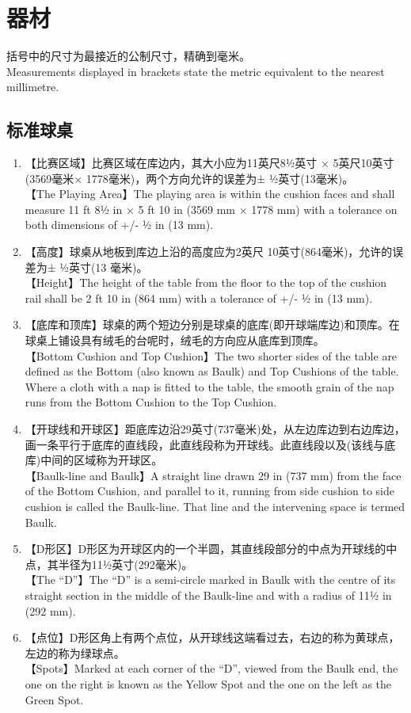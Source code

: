 \section{器材}\label{221}

\noindent 括号中的尺寸为最接近的公制尺寸，精确到毫米。\\
Measurements displayed in brackets state the metric equivalent 
to the nearest millimetre.

\subsection{标准球桌}\label{2211}

\begin{enumerate}[label=(\alph*)]
    \item 【比赛区域】比赛区域在库边内，其大小应为11英尺8½英寸 × 5英尺10英寸(3569毫米× 1778毫米)，两个方向允许的误差为± ½英寸(13毫米)。\\
    【The Playing Area】The playing area is within the cushion faces and shall measure 11 ft 8½ in × 5 ft 10 in (3569 mm × 1778 mm) with a tolerance on both dimensions of +/- ½ in (13 mm).
    \item 【高度】球桌从地板到库边上沿的高度应为2英尺 10英寸(864毫米)，允许的误差为± ½英寸(13 毫米)。\\
    【Height】The height of the table from the floor to the top of the cushion rail shall be 2 ft 10 in (864 mm) with a tolerance of +/- ½ in (13 mm).
    \item 【底库和顶库】球桌的两个短边分别是球桌的底库(即开球端库边)和顶库。在球桌上铺设具有绒毛的台呢时，绒毛的方向应从底库到顶库。\\
    【Bottom Cushion and Top Cushion】The two shorter sides of the table are defined as the Bottom (also known as Baulk) and Top Cushions of the table. Where a cloth with a nap is fitted to the table, the smooth grain of the nap runs from the Bottom Cushion to the Top Cushion.
    \item 【开球线和开球区】距底库边沿29英寸(737毫米)处，从左边库边到右边库边，画一条平行于底库的直线段，此直线段称为开球线。此直线段以及(该线与底库)中间的区域称为开球区。\\
    【Baulk-line and Baulk】A straight line drawn 29 in (737 mm) from the face of the Bottom Cushion, and parallel to it, running from side cushion to side cushion is called the Baulk-line. That line and the intervening space is termed Baulk.
    \item 【D形区】D形区为开球区内的一个半圆，其直线段部分的中点为开球线的中点，其半径为11½英寸(292毫米)。\\
    【The ``D''】The ``D'' is a semi-circle marked in Baulk with the centre of its straight section in the middle of the Baulk-line and with a 
    radius of 11½ in (292 mm).
    \item \label{2211f}【点位】D形区角上有两个点位，从开球线这端看过去，右边的称为黄球点，左边的称为绿球点。\\
    【Spots】Marked at each corner of the ``D'', viewed from the Baulk end, the one on the right is known as the Yellow Spot and the one on the left as the Green Spot.


\end{enumerate}
